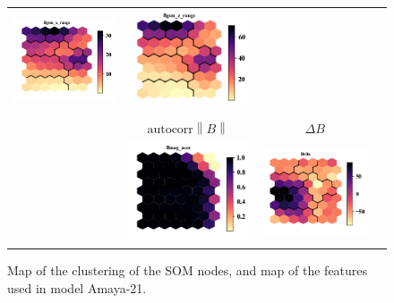 \documentclass[utf8]{frontiersSCNS} %
\begin{document}
\begin{figure}[h!]
\begin{tabular}{CCCC}
		\includegraphics[width=4cm]{Amaya/comp-map-log_Bgsm_x_range} &
		\includegraphics[width=4cm]{Amaya/comp-map-log_Bgsm_z_range}\hfill
		\\
		& $\text{autocorr} \left\lVert B \right\rVert$ & $\Delta B$ & \\
		& \includegraphics[width=4cm]{Amaya/comp-map-Bmag_acor} &
		\includegraphics[width=4cm]{Amaya/comp-map-Delta} & \hfill
		\\
	\end{tabular}
	\caption{Map of the clustering of the SOM nodes, and map of the features used in model Amaya-21.}\label{fig:compmap}
\end{figure}
\end{document}
